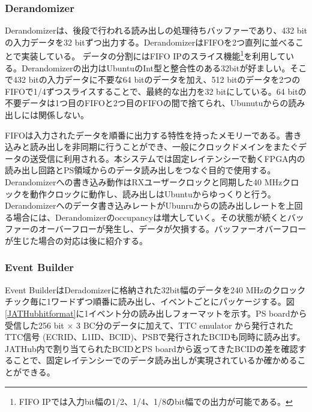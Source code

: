 \subsubsection{Derandomizer} \par
Derandomizerは、後段で行われる読み出しの処理待ちバッファーであり、432 bitの入力データを32 bitずつ出力する。DerandomizerはFIFOを2つ直列に並べることで実装している。
データの分割にはFIFO IPのスライス機能\footnote{FIFO IPでは入力bit幅の1/2、1/4、1/8のbit幅での出力が可能である。}を利用している。Derandomizerの出力はUbuntuのInt型と整合性のある32bitが好ましい。そこで432 bitの入力データに不要な64 bitのデータを加え、512 bitのデータを2つのFIFOで1/4ずつスライスすることで、最終的な出力を32 bitにしている。64 bitの不要データは1つ目のFIFOと2つ目のFIFOの間で捨てられ、Ubunutuからの読み出しには関係しない。\par
FIFOは入力されたデータを順番に出力する特性を持ったメモリーである。書き込みと読み出しを非同期に行うことができ、一般にクロックドメインをまたぐデータの送受信に利用される。本システムでは固定レイテンシーで動くFPGA内の読み出し回路とPS領域からのデータ読み出しをつなぐ目的で使用する。Derandomizerへの書き込み動作はRXユーザークロックと同期した40 MHzクロックを動作クロックに動作し、読み出しはUbuntuからゆっくりと行う。Derandomizerへのデータ書き込みレートがUbunruからの読み出しレートを上回る場合には、Derandomizerのoccupancyは増大していく。その状態が続くとバッファーのオーバーフローが発生し、データが欠損する。バッファーオバーフローが生じた場合の対応は後に紹介する。
\baselineskip

\subsubsection{Event Builder} \par
Event BuilderはDeradomizerに格納された32bit幅のデータを240 MHzのクロックチック毎に1ワードずつ順番に読み出し、イベントごとにパッケージする。図\ref{JATHubhitformat}に1イベント分の読み出しフォーマットを示す。PS boardから受信した256 bit $\times$ 3 BC分のデータに加えて、TTC emulator から発行されたTTC信号 (ECRID、L1ID、BCID)、PSBで発行されたBCIDも同時に読み出す。JATHub内で割り当てられたBCIDとPS boardから返ってきたBCIDの差を確認することで、固定レイテンシーでのデータ読み出しが実現されているか確かめることができる。
\baselineskip

